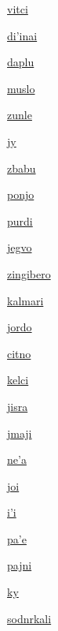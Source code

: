 {\hyperlink{val:vitci}{vitci}}{}{}{}

{\hyperlink{val:dihinai}{di'inai}}{}{}{}

{\hyperlink{val:daplu}{daplu}}{}{}{}

{\hyperlink{val:muslo}{muslo}}{}{}{}

{\hyperlink{val:zunle}{zunle}}{}{}{}

{\hyperlink{val:jy}{jy}}{}{}{}

{\hyperlink{val:zbabu}{zbabu}}{}{}{}

{\hyperlink{val:ponjo}{ponjo}}{}{}{}

{\hyperlink{val:purdi}{purdi}}{}{}{}

{\hyperlink{val:jegvo}{jegvo}}{}{}{}

{\hyperlink{val:zingibero}{zingibero}}{}{}{}

{\hyperlink{val:kalmari}{kalmari}}{}{}{}

{\hyperlink{val:jordo}{jordo}}{}{}{}

{\hyperlink{val:citno}{citno}}{}{}{}

{\hyperlink{val:kelci}{kelci}}{}{}{}

{\hyperlink{val:jisra}{jisra}}{}{}{}

{\hyperlink{val:jmaji}{jmaji}}{}{}{}

{\hyperlink{val:neha}{ne'a}}{}{}{}

{\hyperlink{val:joi}{joi}}{}{}{}

{\hyperlink{val:ihi}{i'i}}{}{}{}

{\hyperlink{val:pahe}{pa'e}}{}{}{}

{\hyperlink{val:pajni}{pajni}}{}{}{}

{\hyperlink{val:ky}{ky}}{}{}{}

{\hyperlink{val:sodnrkali}{sodnrkali}}{}{}{}

